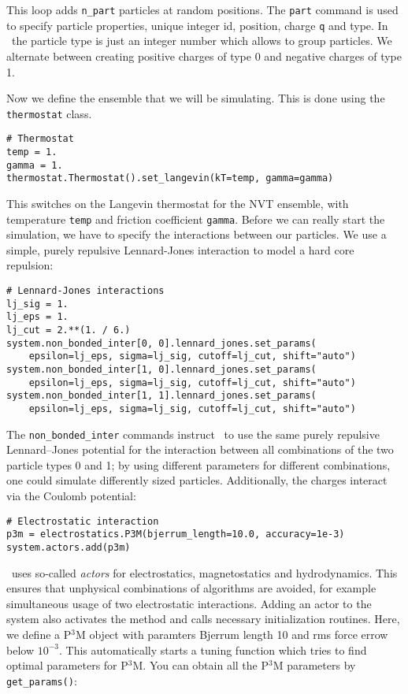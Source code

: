 \documentclass[
a4paper,                        %
11pt,                           %
twoside,                        %
footsepline,                    %
headsepline,                    %
headexclude,                    %
footexclude,                    %
pagesize,                       %
]{scrartcl}
\begin{document}
This loop adds \verb|n_part| particles at random positions. The \verb|part|
command is used to specify particle properties, unique integer id, position, charge \verb|q| and
type. In \es\ the particle type is just an integer number which allows to group
particles. We alternate between creating positive charges of type 0 and negative
charges of type 1. 

Now we define the ensemble that we will be simulating. This is done
using the \verb|thermostat| class. 

\begin{lstlisting}
# Thermostat
temp = 1.
gamma = 1.
thermostat.Thermostat().set_langevin(kT=temp, gamma=gamma)
\end{lstlisting}

This switches on the Langevin thermostat for the NVT ensemble, with
temperature \verb|temp| and friction coefficient \verb|gamma|. 
Before we can really start the simulation, we have to specify the
interactions between our particles. We use a simple, purely repulsive
Lennard-Jones interaction to model a hard core repulsion: 

\begin{lstlisting}
# Lennard-Jones interactions
lj_sig = 1.
lj_eps = 1.
lj_cut = 2.**(1. / 6.)
system.non_bonded_inter[0, 0].lennard_jones.set_params(
    epsilon=lj_eps, sigma=lj_sig, cutoff=lj_cut, shift="auto")
system.non_bonded_inter[1, 0].lennard_jones.set_params(
    epsilon=lj_eps, sigma=lj_sig, cutoff=lj_cut, shift="auto")
system.non_bonded_inter[1, 1].lennard_jones.set_params(
    epsilon=lj_eps, sigma=lj_sig, cutoff=lj_cut, shift="auto")
\end{lstlisting}

The \verb|non_bonded_inter| commands instruct \es\ to use the same
purely repulsive Lennard--Jones potential for the interaction between
all combinations of the two particle types 0 and 1; by using different
parameters for different combinations, one could simulate differently
sized particles. Additionally, the charges interact via the Coulomb potential:

\begin{lstlisting}
# Electrostatic interaction
p3m = electrostatics.P3M(bjerrum_length=10.0, accuracy=1e-3)
system.actors.add(p3m)
\end{lstlisting}

\es\ uses so-called \emph{actors} for electrostatics, magnetostatics and
hydrodynamics. This ensures that unphysical combinations of algorithms are
avoided, for example simultaneous usage of two electrostatic interactions.
Adding an actor to the system also activates the method and calls necessary
initialization routines. Here, we define a P$^3$M object with paramters Bjerrum
length 10 and rms force errow below $10^{-3}$. This automatically starts a
tuning function which tries to find optimal parameters for P$^3$M. You can
obtain all the P$^3$M parameters by \verb|get_params()|:
\end{document}
